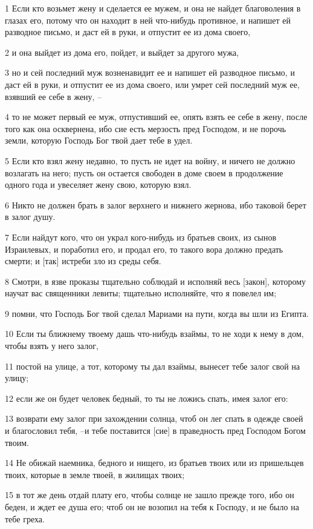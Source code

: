 \par 1 Если кто возьмет жену и сделается ее мужем, и она не найдет благоволения в глазах его, потому что он находит в ней что-нибудь противное, и напишет ей разводное письмо, и даст ей в руки, и отпустит ее из дома своего,
\par 2 и она выйдет из дома его, пойдет, и выйдет за другого мужа,
\par 3 но и сей последний муж возненавидит ее и напишет ей разводное письмо, и даст ей в руки, и отпустит ее из дома своего, или умрет сей последний муж ее, взявший ее себе в жену, --
\par 4 то не может первый ее муж, отпустивший ее, опять взять ее себе в жену, после того как она осквернена, ибо сие есть мерзость пред Господом, и не порочь земли, которую Господь Бог твой дает тебе в удел.
\par 5 Если кто взял жену недавно, то пусть не идет на войну, и ничего не должно возлагать на него; пусть он остается свободен в доме своем в продолжение одного года и увеселяет жену свою, которую взял.
\par 6 Никто не должен брать в залог верхнего и нижнего жернова, ибо таковой берет в залог душу.
\par 7 Если найдут кого, что он украл кого-нибудь из братьев своих, из сынов Израилевых, и поработил его, и продал его, то такого вора должно предать смерти; и [так] истреби зло из среды себя.
\par 8 Смотри, в язве проказы тщательно соблюдай и исполняй весь [закон], которому научат вас священники левиты; тщательно исполняйте, что я повелел им;
\par 9 помни, что Господь Бог твой сделал Мариами на пути, когда вы шли из Египта.
\par 10 Если ты ближнему твоему дашь что-нибудь взаймы, то не ходи к нему в дом, чтобы взять у него залог,
\par 11 постой на улице, а тот, которому ты дал взаймы, вынесет тебе залог свой на улицу;
\par 12 если же он будет человек бедный, то ты не ложись спать, имея залог его:
\par 13 возврати ему залог при захождении солнца, чтоб он лег спать в одежде своей и благословил тебя, --и тебе поставится [сие] в праведность пред Господом Богом твоим.
\par 14 Не обижай наемника, бедного и нищего, из братьев твоих или из пришельцев твоих, которые в земле твоей, в жилищах твоих;
\par 15 в тот же день отдай плату его, чтобы солнце не зашло прежде того, ибо он беден, и ждет ее душа его; чтоб он не возопил на тебя к Господу, и не было на тебе греха.
